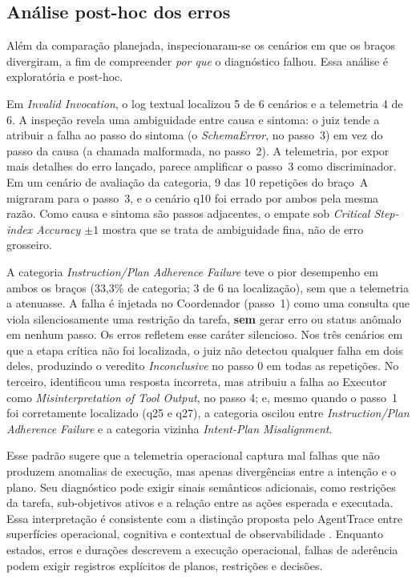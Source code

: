 \documentclass[sigconf]{acmart}
\begin{document}
\subsection{Análise post-hoc dos erros}
\label{subsec:posthoc}

Além da comparação planejada, inspecionaram-se os cenários em que os braços divergiram, a fim de compreender
\textit{por que} o diagnóstico falhou. Essa análise é exploratória e post-hoc.

Em \textit{Invalid Invocation}, o log textual localizou 5 de 6 cenários e a telemetria 4 de 6. A inspeção revela uma
ambiguidade entre causa e sintoma: o juiz tende a atribuir a falha ao passo do sintoma (o \textit{SchemaError}, no
passo~3) em vez do passo da causa (a chamada malformada, no passo~2). A telemetria, por expor mais detalhes do erro
lançado, parece amplificar o passo~3 como discriminador. Em um cenário de avaliação da categoria, 9 das 10 repetições
do braço~A migraram para o passo~3, e o cenário q10 foi errado por ambos pela mesma razão. Como causa e sintoma são
passos adjacentes, o empate sob \textit{Critical Step-index Accuracy $\pm 1$} mostra que se trata de ambiguidade fina,
não de erro grosseiro.

A categoria \textit{Instruction/Plan Adherence Failure} teve o pior desempenho em ambos os braços (33,3\% de categoria;
3 de 6 na localização), sem que a telemetria a atenuasse. A falha é injetada no Coordenador (passo~1) como uma consulta
que viola silenciosamente uma restrição da tarefa, \textbf{sem} gerar erro ou status anômalo em nenhum passo. Os erros
refletem esse caráter silencioso. Nos três cenários em que a etapa crítica não foi localizada, o juiz não detectou
qualquer falha em dois deles, produzindo o veredito \textit{Inconclusive} no passo 0 em todas as repetições. No
terceiro, identificou uma resposta incorreta, mas atribuiu a falha ao Executor como \textit{Misinterpretation of Tool
	Output}, no passo 4; e, mesmo quando o passo~1 foi corretamente localizado (q25 e q27), a categoria oscilou entre
\textit{Instruction/Plan Adherence Failure} e a categoria vizinha \textit{Intent-Plan Misalignment}.

Esse padrão sugere que a telemetria operacional captura mal falhas que não produzem anomalias de execução, mas apenas
divergências entre a intenção e o plano. Seu diagnóstico pode exigir sinais semânticos adicionais, como restrições da
tarefa, sub-objetivos ativos e a relação entre as ações esperada e executada. Essa interpretação é consistente com a
distinção proposta pelo AgentTrace entre superfícies operacional, cognitiva e contextual de observabilidade
\cite{alsayyad2026agenttrace}. Enquanto estados, erros e durações descrevem a execução operacional, falhas de aderência
podem exigir registros explícitos de planos, restrições e decisões.
\end{document}
